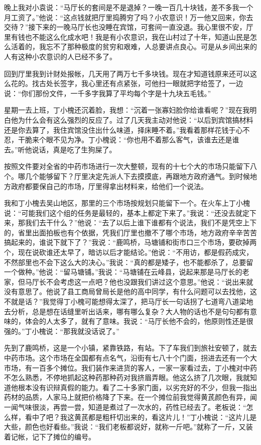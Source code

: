 \documentclass[12pt,oneside]{book}
\begin{document}
晚上我对小袁说：``马厅长的套间是不是退掉？一晚一百几十块钱，差不多我一个月工资了。''他说：``这点钱就把厅里捣腾穷了吗？小农意识！万一他又回来，你去交待？''接下来的一晚马厅长也没睡在宾馆，可套间一直没退。我心里很不安，厅里有钱也不能这么化成水吧！我是有小农意识，我在山村过了十年，知道山民是怎么活着的，我忘不了那种极度的贫穷和艰难，人总要讲点良心。可是从乡间出来的人有这种小农意识的人已经不多了。

回到厅里我到计财处报帐，几天用了两万七千多块钱。现在才知道钱原来还可以这么花的。找古处长签字，我心里还有点紧张，可他扫一眼就把字给签了，一边说：``你们那份文件，一千多字我算了平均每个字是十九块五毛钱。''

星期一去上班，丁小槐还沉着脸，我想：``沉着一张寡妇脸你给谁看呢？''现在我明白他为什么会有这么强烈的反应了。过了几天我主动对他说：``以后到宾馆搞材料还是你去算了，我住宾馆没住出什么味道，择床睡不着。''我看着那样花钱于心不忍，干脆来个眼不见为净。丁小槐说：``你也用不着那么客气，该谁去还是谁去。''听他说话，真是吃了生狗屎了。

按照文件要对全省的中药市场进行一次大整顿，现有的十七个大的市场只能留下八个。哪几个能够留下？厅里决定先派人下去摸摸底，再跟地方政府通气。到时候地方政府都要保自己的市场，厅里得拿出材料来，给他们一个说法。

我和丁小槐去吴山地区，那里的三个市场按规划只能留下一个。在火车上丁小槐说：``可能我们这个组的任务是最轻的，基本上都定下来了。''我说：``还没去就定下来，那我们去干什么？''他说：``去了以后上谁下谁都有个说法，我们不是凭空上下的，省里出面拍板也有个依据，凭我们厅里也撤不了哪个市场，地方政府辛辛苦苦搞起来的，谁说下就下了？''我说：``鹿鸣桥，马塘铺和街市口三个市场，要砍掉两个，现在说砍谁还太早了，暗访以后才能结论。''他说：``不用访，都是假药成灾，不然部里也不会下这么大的决心。''我说：``真的都是矮子，也不能都杀了，总要留一个做种。''他说：``留马塘铺。''我说：``马塘铺在云峰县，说起来那是马厅长的老家，但马厅长不会考虑这一点吧？他也没跟我们讲过这个意思。''他说：``说出来就没有意思了。他说了县工商局曾局长是他的高中同学，有什么问题可以去找他，这不就是话？''我觉得丁小槐可能想得太深了，把马厅长一句话拐了七道弯八道梁地去分析，总是想在话缝里听出话来，哪有哪么复杂？大人物的话也不是句句都有意味的，体会的人太多了，就有了意味。我说：``马厅长他不会的，他原则性还是很强的。''丁小槐说：``那我就没话说了。''

先到了鹿鸣桥，这是一个小镇，紧靠铁路，有站。下了车我们到旅社安顿了，就去中药市场。这个市场在全国都有点名气，沿街有七八十个门面，拐进去还有一个大市场，有一百多个摊位。我们装作来进货的客人，一家一家看过去，丁小槐对中药不怎么熟悉，不停地抓起这种药那种药对我挤眉弄眼。他这么挤了几次眼，我就知道他根本没有识辩真假的能力。看了二十多家门面，以劣充好的不少，但我一指出药材的品质，人家马上就把价格降了下来。在一个摊位前我觉得黄芪颜色有异，闻一闻气味很淡，再尝一尝，知道是煮过了一次水的，药性已经去了。老板说：``怎么样，看中了吧？我这黄芪都是粗杆切出来的，看这片儿！''丁小槐说：``这片儿是大些，颜色也好看些。''我说：``我们老板都说好，就称一斤吧。''就称了一斤，又装着记帐，记下了摊位的编号。
\end{document}
